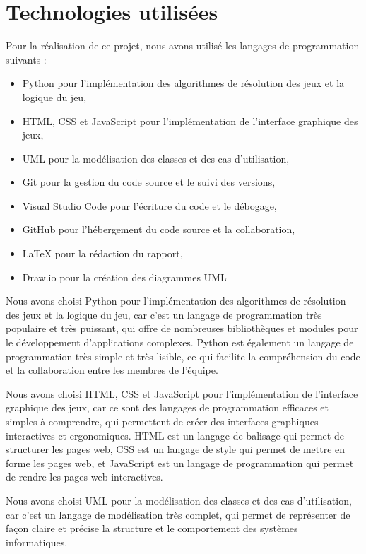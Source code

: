 \section{Technologies utilisées}

Pour la réalisation de ce projet, nous avons utilisé les langages de programmation suivants :
\begin{itemize}
	\item Python pour l'implémentation des algorithmes de résolution des jeux et la logique du jeu,
	\item HTML, CSS et JavaScript pour l'implémentation de l'interface graphique des jeux,
	\item UML pour la modélisation des classes et des cas d'utilisation,
	\item Git pour la gestion du code source et le suivi des versions,
	\item Visual Studio Code pour l'écriture du code et le débogage,
	\item GitHub pour l'hébergement du code source et la collaboration,
	\item LaTeX pour la rédaction du rapport,
	\item Draw.io pour la création des diagrammes UML
\end{itemize}

Nous avons choisi Python pour l'implémentation des algorithmes de résolution des 
jeux et la logique du jeu, car c'est un langage de programmation très populaire et 
très puissant, qui offre de nombreuses bibliothèques et modules pour le 
développement d'applications complexes. 
Python est également un langage de programmation très simple et très lisible, 
ce qui facilite la compréhension du code et la collaboration entre les membres de 
l'équipe.

Nous avons choisi HTML, CSS et JavaScript pour l'implémentation de l'interface
graphique des jeux, car ce sont des langages de programmation efficaces et 
simples à comprendre, qui permettent de créer des interfaces graphiques interactives 
et ergonomiques. HTML est un langage de balisage qui permet de structurer les pages
web, CSS est un langage de style qui permet de mettre en forme les pages web, et
JavaScript est un langage de programmation qui permet de rendre les pages web
interactives.

Nous avons choisi UML pour la modélisation des classes et des cas d'utilisation,
car c'est un langage de modélisation très complet, qui permet de représenter de
façon claire et précise la structure et le comportement des systèmes informatiques.

